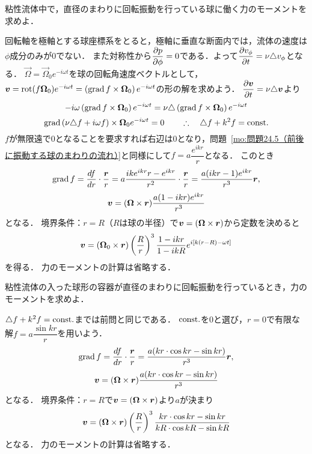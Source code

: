 \begin{mondai}{}{}
粘性流体中で，直径のまわりに回転振動を行っている球に働く力のモーメントを求めよ．
\end{mondai}
\begin{kaitou}
回転軸を極軸とする球座標系をとると，極軸に垂直な断面内では，流体の速度は$\phi$成分のみが0でない．
また対称性から$\dpdv{p}{\phi}=0$である．よって$\dpdv{v_\phi}{t} = \nu\Laplacian v_\phi$となる．
$\vec{\Omega} = \vec{\Omega}_0 e^{-i\omega t}$を球の回転角速度ベクトルとして，
$\vb*{v} = \operatorname{rot}(f \vb*{\Omega}_0)e^{-i\omega t} = \left( \operatorname{grad} f \times \vb*{\Omega}_0 \right) e^{-i\omega t}$の形の解を求めよう．
$\dpdv{\v}{t} = \nu\Laplacian\v$より
\[
    -i\omega \left( \operatorname{grad} f \times \vb*{\Omega}_0 \right) e^{-i\omega t} = \nu \triangle \left( \operatorname{grad} f \times \vb*{\Omega}_0 \right) e^{-i\omega t}
\]
\[
    \operatorname{grad}\left( \nu\triangle f + i\omega f \right) \times \vb*{\Omega}_0 e^{-i\omega t} = 0
    \qquad\therefore\quad \triangle f + k^2 f = \mathrm{const.}
\]
$f$が無限遠で0となることを要求すれば右辺は0となり，問題~\ref{mo:問題24.5（前後に振動する球のまわりの流れ）}と同様にして$f = a \dfrac{e^{ikr}}{r}$となる．
このとき
\[
    \operatorname{grad} f = \dv{f}{r} \cdot \frac{\vb*{r}}{r} = a \frac{ik e^{ikr}r - e^{ikr}}{r^2} \cdot \frac{\vb*{r}}{r}
    = \frac{a(ikr-1) e^{ikr}}{r^3} \vb*{r},
\]
\[
    \vb*{v} = ( \vb*{\Omega}\times\vb*{r} ) \frac{a(1-ikr) e^{ikr}}{r^3}
\]
となる．
境界条件：$r=R$（$R$は球の半径）で$\vb*{v} = ( \vb*{\Omega}\times\vb*{r} )$から定数を決めると
\[
    \vb*{v} = ( \vb*{\Omega}_0\times\vb*{r} ) \left( \frac{R}{r} \right)^3 \frac{1-ikr}{1-ikR} e^{i[k(r-R)-\omega t]}
\]
を得る．
力のモーメントの計算は省略する．



\end{kaitou}





\begin{mondai}{}{}
粘性流体の入った球形の容器が直径のまわりに回転振動を行っているとき，力のモーメントを求めよ．
\end{mondai}
\begin{kaitou}
$\triangle f + k^2 f = \mathrm{const.}$までは前問と同じである．
$\mathrm{const.}$を0と選び，$r=0$で有限な解$f = a\dfrac{\sin kr}{r}$を用いよう．
\[
    \operatorname{grad} f = \dv{f}{r} \cdot \frac{\vb*{r}}{r} = \frac{a (kr\cdot\cos kr - \sin kr)}{r^3}\vb*{r},
\]
\[
    \vb*{v} = ( \vb*{\Omega}\times\vb*{r} ) \frac{a (kr\cdot\cos kr - \sin kr)}{r^3}
\]
となる．
境界条件：$r=R$で$\vb*{v}=( \vb*{\Omega}\times\vb*{r} )$より$a$が決まり
\[
    \vb*{v} = ( \vb*{\Omega}\times\vb*{r} ) \left( \frac{R}{r} \right)^3 \frac{kr\cdot\cos kr - \sin kr}{kR\cdot\cos kR - \sin kR}
\]
となる．
力のモーメントの計算は省略する．


\end{kaitou}



\BackToTheToc